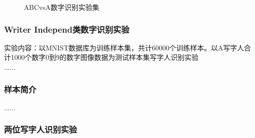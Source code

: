 \begin{figure}[!htbp]
    \centering
    \caption{ABCvsA数字识别实验集}
    \label{fig:both_images}
\end{figure}

\subsubsection{Writer Independ类数字识别实验}
实验内容：以MNIST数据库为训练样本集，共计60000个训练样本。以A写字人合计1000个数字0到9的数字图像数据为测试样本集写字人识别实验\\
\hspace*{\parindent}......

\subsubsection{样本简介}
......

\subsubsection{两位写字人识别实验}
